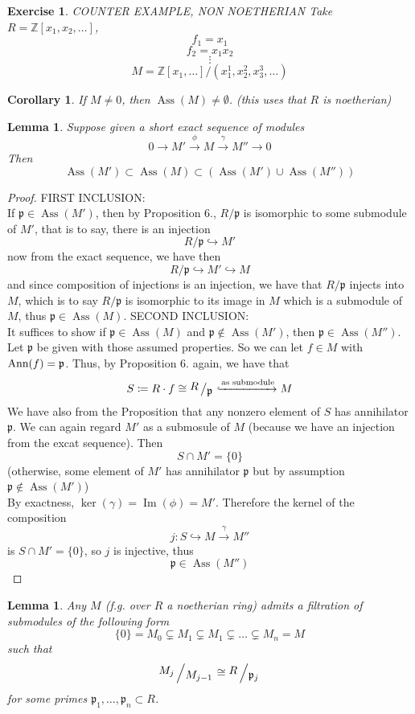 \documentclass[12pt]{article}
\newcommand{\z}{\mathbb{Z}}
\newcommand{\ann}[1]{\textup{Ann}(#1)}
\DeclareMathOperator{\Ass}{Ass}
\DeclareMathOperator{\Im}{Im}
\newcommand{\bigslant}[2]{{\raisebox{.2em}{$#1$}\left/\raisebox{-.2em}{$#2$}\right.}}
\def\p{\mathfrak{p}}
\newtheorem{corollary}[theorem]{Corollary}
\newtheorem{lemma}[theorem]{Lemma}
\newtheorem*{exercise}{Exercise}
\theoremstyle{definition}
\begin{document}
\begin{exercise}
COUNTER EXAMPLE, NON NOETHERIAN
Take $R = \z[x_1,x_2,\dots]$, 
\[
f_1 = x_1
\]
\[
f_2 = x_1x_2
\]
\[
\vdots
\]
\[
M = \z[x_1,\dots] / (x_1^1, x_2^2, x_3^3, \dots)
\]
\end{exercise}
\begin{corollary}
If $M\neq 0$, then $\Ass(M) \neq \emptyset$. (this uses that $R$ is noetherian)
\end{corollary}
\begin{lemma}
Suppose given a short exact sequence of modules
\[
0 \rightarrow M'\xrightarrow{\phi} M \xrightarrow{\gamma} M'' \rightarrow 0
\]
Then
\[
\Ass(M') \subset \Ass(M) \subset (\Ass(M') \cup \Ass(M''))
\]
\end{lemma}
\begin{proof}
FIRST INCLUSION:\\
If $\p \in \Ass(M')$, then by Proposition 6., $R/\p$ is isomorphic to some submodule of $M'$, that is to say, there is an injection
\[
R/\p \hookrightarrow M'
\]
now from the exact sequence, we have then 
\[
R/\p \hookrightarrow M' \hookrightarrow M
\]
and since composition of injections is an injection, we have that $R/\p$ injects into $M$, which is to say $R/\p$ is isomorphic to its image in $M$ which is a submodule of $M$, thus $\p \in \Ass(M)$.
SECOND INCLUSION:\\
It suffices to show if $\p \in \Ass(M)$ and $\p \notin \Ass(M')$, then $\p \in \Ass(M'')$. Let $\p$ be given with those assumed properties. So we can let $f\in M$ with $\ann{f} = \p$. Thus, by Proposition 6. again, we have that
\[
S \coloneqq R\cdot f \cong \bigslant{R}{\p} \xhookrightarrow{\text{as submodule}} M
\]
We have also from the Proposition that any nonzero element of $S$ has annihilator $\p$. We can again regard $M'$ as a submosule of $M$ (because we have an injection from the excat sequence). Then
\[
S \cap M' = \{0\}
\]
(otherwise, some element of $M'$ has annihilator $\p$ but by assumption $\p \notin \Ass(M')$)\\
By exactness, $\ker(\gamma) = \Im(\phi) = M'$. Therefore the kernel of the composition
\[
j: S \hookrightarrow M \xrightarrow{\gamma} M''
\]
is $S \cap M' = \{0\}$, so $j$ is injective, thus
\[
\p \in \Ass(M'')
\]
\end{proof}
\begin{lemma}
Any $M$ (f.g. over $R$ a noetherian ring) admits a filtration of submodules of the following form
\[
\{0\} = M_0\subsetneq M_1 \subsetneq M_1 \subsetneq \dots \subsetneq M_n = M
\]
such that
\[
\bigslant{M_j}{M_{j-1}} \cong \bigslant{R}{\p_j}
\]
for some primes $\p_1,\dots,\p_n \subset R$.
\end{lemma}
\end{document}
